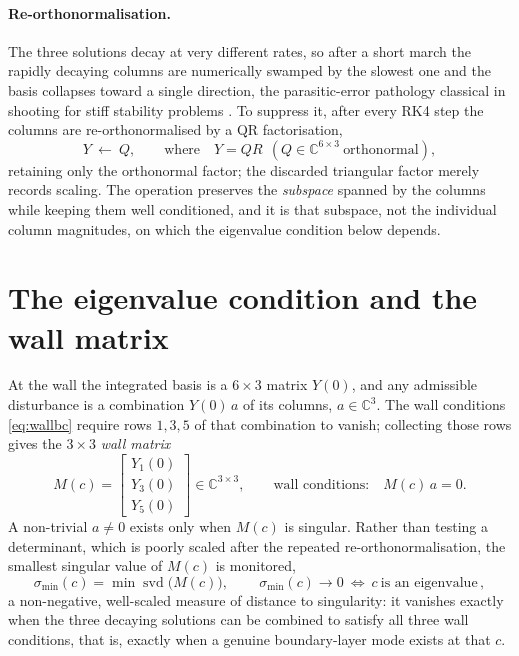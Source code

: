 \documentclass[11pt]{article}
\begin{document}
\paragraph{Re-orthonormalisation.} The three solutions decay at very different rates, so after a
short march the rapidly decaying columns are numerically swamped by the slowest one and the basis
collapses toward a single direction, the parasitic-error pathology classical in shooting for stiff
stability problems \cite{conte1966,mack1984}. To suppress it, after every RK4 step the columns are
re-orthonormalised by a QR factorisation,
\begin{equation}\label{eq:reortho}
  Y\ \longleftarrow\ Q,\qquad\text{where}\quad Y=QR\ \ (Q\in\mathbb C^{6\times3}\ \text{orthonormal}),
\end{equation}
retaining only the orthonormal factor; the discarded triangular factor merely records scaling. The
operation preserves the \emph{subspace} spanned by the columns while keeping them well conditioned,
and it is that subspace, not the individual column magnitudes, on which the eigenvalue
condition below depends.

\section{The eigenvalue condition and the wall matrix}\label{sec:shoot-wall}
At the wall the integrated basis is a $6\times3$ matrix $Y(0)$, and any admissible disturbance is a
combination $Y(0)\,a$ of its columns, $a\in\mathbb C^3$. The wall conditions \eqref{eq:wallbc}
require rows $1,3,5$ of that combination to vanish; collecting those rows gives the $3\times3$
\emph{wall matrix}
\begin{equation}\label{eq:wallmat}
  M(c)=\begin{bmatrix} Y_{1}(0)\\ Y_{3}(0)\\ Y_{5}(0)\end{bmatrix}\in\mathbb C^{3\times3},
  \qquad\text{wall conditions:}\quad M(c)\,a=0 .
\end{equation}
A non-trivial $a\neq0$ exists only when $M(c)$ is singular. Rather than testing a determinant, which
is poorly scaled after the repeated re-orthonormalisation, the smallest singular
value of $M(c)$ is monitored,
\begin{equation}\label{eq:sigmamin}
  \sigma_{\min}(c)=\min\operatorname{svd}\!\big(M(c)\big),\qquad
  \boxed{\,\sigma_{\min}(c)\to0\ \Longleftrightarrow\ c\ \text{is an eigenvalue}\,},
\end{equation}
a non-negative, well-scaled measure of distance to singularity: it vanishes exactly when the three
decaying solutions can be combined to satisfy all three wall conditions, that is, exactly when a
genuine boundary-layer mode exists at that $c$.
\end{document}
